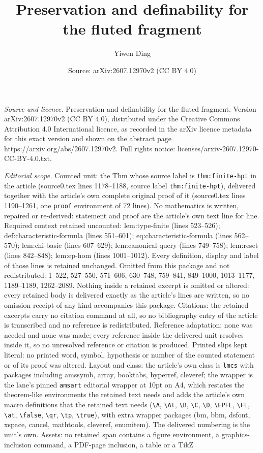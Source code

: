 \documentclass[10pt,a4paper]{amsart}
\title[Preservation and definability for the fluted fragment]{Preservation and definability for the fluted fragment}
\author{Yiwen Ding}
\date{Source: arXiv:2607.12970v2 (CC BY 4.0)}
\begin{document}
\maketitle

\noindent\emph{Source and licence.} Preservation and definability for the fluted fragment. Version arXiv:2607.12970v2 (CC BY 4.0), distributed under the Creative Commons Attribution 4.0 International licence, as recorded in the arXiv licence metadata for this exact version and shown on the abstract page https://arxiv.org/abs/2607.12970v2. Full rights notice: licenses/arxiv-2607.12970-CC-BY-4.0.txt.\par\smallskip

\noindent\textit{Editorial scope.} Counted unit: the Thm whose source label is \texttt{thm:finite-hpt} in the article (source0.tex lines 1178--1188, source label \texttt{thm:finite-hpt}), delivered together with the article's own complete original proof of it (source0.tex lines 1190--1261, one \texttt{proof} environment of 72 lines). No mathematics is written, repaired or re-derived: statement and proof are the article's own text line for line. Required context retained uncounted: lem:type-finite (lines 523--526); def:characteristic-formula (lines 551--601); eq:characteristic-formula (lines 562--570); lem:chi-basic (lines 607--629); lem:canonical-query (lines 749--758); lem:reset (lines 842--848); lem:ep-hom (lines 1001--1012). Every definition, display and label of those lines is retained unchanged. Omitted from this package and not redistributed: 1--522, 527--550, 571--606, 630--748, 759--841, 849--1000, 1013--1177, 1189--1189, 1262--2089. Nothing inside a retained excerpt is omitted or altered: every retained body is delivered exactly as the article's lines are written, so no omission receipt of any kind accompanies this package. Citations: the retained excerpts carry no citation command at all, so no bibliography entry of the article is transcribed and no reference is redistributed. Reference adaptation: none was needed and none was made; every reference inside the delivered unit resolves inside it, so no unresolved reference or citation is produced. Printed slips kept literal: no printed word, symbol, hypothesis or number of the counted statement or of its proof was altered. Layout and class: the article's own class is \texttt{lmcs} with packages including amssymb, array, booktabs, hyperref, cleveref; the wrapper is the lane's pinned \texttt{amsart} editorial wrapper at 10pt on A4, which restates the theorem-like environments the retained text needs and adds the article's own macro definitions that the retained text needs (\texttt{\textbackslash A}, \texttt{\textbackslash At}, \texttt{\textbackslash B}, \texttt{\textbackslash C}, \texttt{\textbackslash D}, \texttt{\textbackslash EPFL}, \texttt{\textbackslash FL}, \texttt{\textbackslash at}, \texttt{\textbackslash false}, \texttt{\textbackslash qr}, \texttt{\textbackslash tp}, \texttt{\textbackslash true}), with extra wrapper packages (bm, bbm, dsfont, xspace, cancel, mathtools, cleveref, enumitem). The delivered numbering is the unit's own. Assets: no retained span contains a figure environment, a graphics-inclusion command, a PDF-page inclusion, a table or a TikZ 
\end{document}
